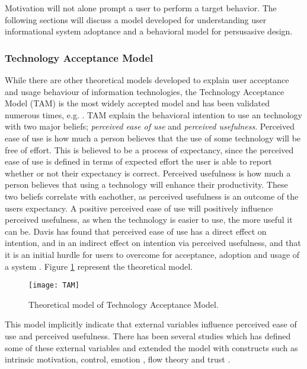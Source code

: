 Motivation will not alone prompt a user to perform a target behavior. The following sections will discuss a model developed for understanding user informational system adoptance and a behavioral model for persusasive design.

\subsubsection{Technology Acceptance Model}
While there are other theoretical models developed to explain user acceptance and usage behaviour of information technologies, the Technology Acceptance Model (TAM) \cite{Davis1989} \cite{Davis1989a} is the most widely accepted model and has been validated numerous times, e.g. \cite{Hu1999} \cite{Chau1996} \cite{Mathieson1991}. TAM explain the behavioral intention to use an technology with two major beliefs; \textit{perceived ease of use} and \textit{perceived usefulness}. Perceived ease of use is how much a person believes that the use of some technology will be free of effort. This is believed to be a process of expectancy, since the perceived ease of use is defined in terms of expected effort the user is able to report whether or not their expectancy is correct. Perceived usefulness is how much a person believes that using a technology will enhance their productivity. These two beliefs correlate with eachother, as perceived usefulness is an outcome of the users expectancy. A positive perceived ease of use will positively influence perceived usefulness, as when the technology is easier to use, the more useful it can be. Davis \cite{Davis1989} has found that perceived ease of use has a direct effect on intention, and in an indirect effect on intention via perceived usefulness, and that it is an initial hurdle for users to overcome for acceptance, adoption and usage of a system \cite{Davis1989a}. Figure \ref{fig:TAM} represent the theoretical model.

\begin{figure}[h]
  \centering
    \texttt{[image: TAM]}
  \caption{Theoretical model of Technology Acceptance Model.}
  \label{fig:TAM}
\end{figure}

This model implicitly indicate that external variables influence perceived ease of use and perceived usefulness. There has been several studies which has defined some of these external variables and extended the model with constructs such as intrinsic motivation, control, emotion \cite{Venkatesh2000}, flow theory \cite{Koufaris2002} and trust \cite{Gefen2003}.


